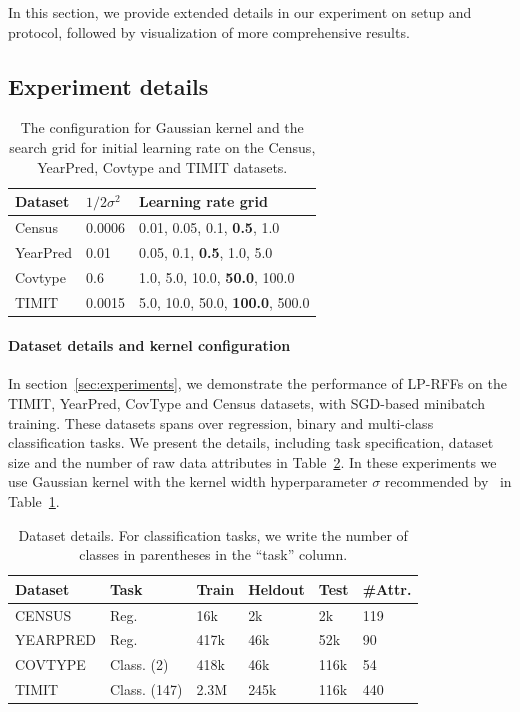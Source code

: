 In this section, we provide extended details in our experiment on setup and protocol, followed by visualization of more comprehensive results.
\subsection{Experiment details}
\label{subsec:app_exp_detail}
\begin{table}
	\caption{The configuration for Gaussian kernel and the search grid for initial learning rate on the Census, YearPred, Covtype and TIMIT datasets.}
	\label{tab:hyperparam}
	\begin{center}
	\begin{tabular}{lll}
	\toprule
	Dataset & $1/2\sigma^2$ & Learning rate grid \\
	\midrule
Census & 0.0006 & {0.01, 0.05, 0.1, \textbf{0.5}, 1.0} \\
YearPred & 0.01 & {0.05, 0.1, \textbf{0.5}, 1.0, 5.0} \\
Covtype & 0.6 & {1.0, 5.0, 10.0, \textbf{50.0}, 100.0} \\
TIMIT & 0.0015 & {5.0, 10.0, 50.0, \textbf{100.0}, 500.0} \\
	\bottomrule
	\end{tabular}
	\end{center}
	\label{tab:kernel_hyper}
\end{table}

\paragraph{Dataset details and kernel configuration}
In section~\ref{sec:experiments}, we demonstrate the performance of LP-RFFs on the TIMIT, YearPred, CovType and Census datasets, with SGD-based minibatch training. These datasets spans over regression, binary and multi-class classification tasks. We present the details, including task specification, dataset size and the number of raw data attributes in Table~\ref{tab:dataset_details}. In these experiments we use Gaussian kernel with the kernel width hyperparameter $\sigma$ recommended by~\cite{may2017} in Table~\ref{tab:kernel_hyper}. 
\begin{table}
	\caption{Dataset details.  For classification tasks, we write the number
		of classes in parentheses in the ``task'' column.}
	\label{tab:datasets}
	\begin{center}
		\begin{tabular}{llllll} 
			\toprule
			\textbf{Dataset}  & \textbf{Task} & \textbf{Train} & \textbf{Heldout} & \textbf{Test} & \textbf{\#Attr.} \\ 
			\midrule
			CENSUS   & Reg.   & 16k   & 2k      & 2k   & 119 \\ 
			YEARPRED & Reg.   & 417k  & 46k     & 52k  & 90  \\ 
			COVTYPE  & Class. (2) & 418k  & 46k     & 116k & 54  \\ 
			TIMIT    & Class. (147) & 2.3M  & 245k    & 116k & 440 \\
			\bottomrule
		\end{tabular}
	\end{center}
	\label{tab:dataset_details}
\end{table}

